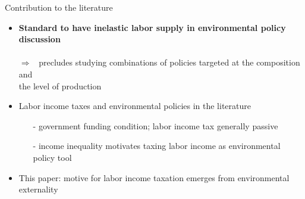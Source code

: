 \documentclass[11pt,aspectratio=169]{beamer}
\newcommand{\ar}{$\Rightarrow$ \ }
\begin{document}
\begin{frame}{Contribution to the literature}
	\begin{itemize}[<+->]
		\item \alert{\textbf{Standard to have inelastic labor supply in environmental policy discussion}}\\  \footnotesize{ \citep{Acemoglu2012TheChange, Golosov2014OptimalEquilibrium, Acemoglu2016TransitionTechnology, Fried2018ClimateAnalysis, Hart2019TheEconomists}}
		\\  \normalsize{\alert{\ar precludes studying combinations of policies targeted at the composition and\\ \hspace{5mm} the level of production }}
		\vspace{2mm}
		\item {Labor income taxes and environmental policies in the literature}
		\begin{itemize}
			\item[-]  government funding condition; labor income tax generally passive \\
			 \footnotesize{ \citep{ LansBovenberg1994EnvironmentalTaxation, Goulder1995EnvironmentalGuide, Barrage2019OptimalPolicy}} %
			\item[-] {income inequality} motivates taxing labor income as environmental policy tool \\ \footnotesize{\citep{Jacobs2019RedistributionCurves, Dobkowitz2022, Douenne2022OptimalHouseholds}}
		\end{itemize}		
		\vspace{2mm}
		\item \alert{This paper}: motive for labor income taxation emerges from  environmental externality %

\end{itemize}
\end{frame}
\end{document}
